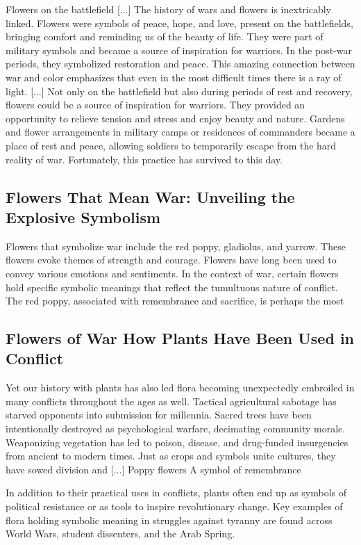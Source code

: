 \documentclass[12pt]{article}
\begin{document}
Flowers on the battlefield [...] The history of wars and flowers is inextricably linked. Flowers were symbols of peace, hope, and love, present on the battlefields, bringing comfort and reminding us of the beauty of life. They were part of military symbols and became a source of inspiration for warriors. In the post-war periods, they symbolized restoration and peace. This amazing connection between war and color emphasizes that even in the most difficult times there is a ray of light. [...] Not only on the battlefield but also during periods of rest and recovery, flowers could be a source of inspiration for warriors. They provided an opportunity to relieve tension and stress and enjoy beauty and nature. Gardens and flower arrangements in military camps or residences of commanders became a place of rest and peace, allowing soldiers to temporarily escape from the hard reality of war. Fortunately, this practice has survived to this day.\subsection{Flowers That Mean War: Unveiling the Explosive Symbolism}
Flowers that symbolize war include the red poppy, gladiolus, and yarrow. These flowers evoke themes of strength and courage. Flowers have long been used to convey various emotions and sentiments. In the context of war, certain flowers hold specific symbolic meanings that reflect the tumultuous nature of conflict. The red poppy, associated with remembrance and sacrifice, is perhaps the most\subsection{Flowers of War How Plants Have Been Used in Conflict}
Yet our history with plants has also led flora becoming unexpectedly embroiled in many conflicts throughout the ages as well. Tactical agricultural sabotage has starved opponents into submission for millennia. Sacred trees have been intentionally destroyed as psychological warfare, decimating community morale. Weaponizing vegetation has led to poison, disease, and drug-funded insurgencies from ancient to modern times. Just as crops and symbols unite cultures, they have sowed division and [...] Poppy flowers A symbol of remembrance

In addition to their practical uses in conflicts, plants often end up as symbols of political resistance or as tools to inspire revolutionary change. Key examples of flora holding symbolic meaning in struggles against tyranny are found across World Wars, student dissenters, and the Arab Spring.
\end{document}

